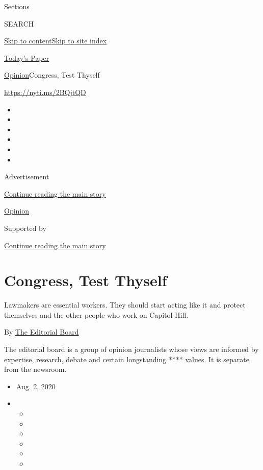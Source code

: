 Sections

SEARCH

\protect\hyperlink{site-content}{Skip to
content}\protect\hyperlink{site-index}{Skip to site index}

\href{https://myaccount.nytimes3xbfgragh.onion/auth/login?response_type=cookie\&client_id=vi}{}

\href{https://www.nytimes3xbfgragh.onion/section/todayspaper}{Today's
Paper}

\href{/section/opinion}{Opinion}\textbar{}Congress, Test Thyself

\url{https://nyti.ms/2BQjtQD}

\begin{itemize}
\item
\item
\item
\item
\item
\item
\end{itemize}

Advertisement

\protect\hyperlink{after-top}{Continue reading the main story}

\href{/section/opinion}{Opinion}

Supported by

\protect\hyperlink{after-sponsor}{Continue reading the main story}

\hypertarget{congress-test-thyself}{%
\section{Congress, Test Thyself}\label{congress-test-thyself}}

Lawmakers are essential workers. They should start acting like it and
protect themselves and the other people who work on Capitol Hill.

By
\href{https://www.nytimes3xbfgragh.onion/interactive/opinion/editorialboard.html}{The
Editorial Board}

The editorial board is a group of opinion journalists whose views are
informed by expertise, research, debate and certain longstanding ****
\href{https://www.nytimes3xbfgragh.onion/interactive/2018/opinion/editorialboard.html}{values}.
It is separate from the newsroom.

\begin{itemize}
\item
  Aug. 2, 2020
\item
  \begin{itemize}
  \item
  \item
  \item
  \item
  \item
  \item
  \end{itemize}
\end{itemize}

